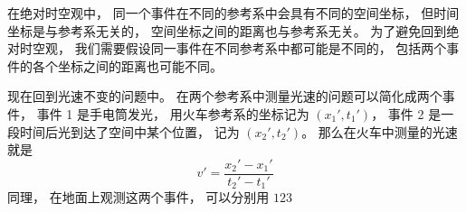 在绝对时空观中， 同一个事件在不同的参考系中会具有不同的空间坐标， 但时间坐标是与参考系无关的， 空间坐标之间的距离也与参考系无关。 为了避免回到绝对时空观， 我们需要假设同一事件在不同参考系中都可能是不同的， 包括两个事件的各个坐标之间的距离也可能不同。

现在回到光速不变的问题中。 在两个参考系中测量光速的问题可以简化成两个事件， 事件 1 是手电筒发光， 用火车参考系的坐标记为 $(x_1', t_1')$， 事件 2 是一段时间后光到达了空间中某个位置， 记为 $(x_2', t_2')$。 那么在火车中测量的光速就是
\begin{equation}
v' = \frac{x_2' - x_1'}{t_2' - t_1'}
\end{equation}
同理， 在地面上观测这两个事件， 可以分别用 $123$
